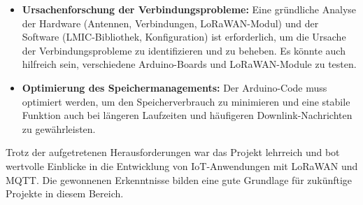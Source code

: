 \documentclass[12pt,a4paper]{article}
\begin{document}
\begin{itemize}
    \item \textbf{Ursachenforschung der Verbindungsprobleme:} Eine gründliche Analyse der Hardware (Antennen, Verbindungen, LoRaWAN-Modul) und der Software (LMIC-Bibliothek, Konfiguration) ist erforderlich, um die Ursache der Verbindungsprobleme zu identifizieren und zu beheben.  Es könnte auch hilfreich sein, verschiedene Arduino-Boards und LoRaWAN-Module zu testen.
    \item \textbf{Optimierung des Speichermanagements:} Der Arduino-Code muss optimiert werden, um den Speicherverbrauch zu minimieren und eine stabile Funktion auch bei längeren Laufzeiten und häufigeren Downlink-Nachrichten zu gewährleisten.
\end{itemize}

Trotz der aufgetretenen Herausforderungen war das Projekt lehrreich und bot wertvolle Einblicke in die Entwicklung von IoT-Anwendungen mit LoRaWAN und MQTT. Die gewonnenen Erkenntnisse bilden eine gute Grundlage für zukünftige Projekte in diesem Bereich.
\end{document}
